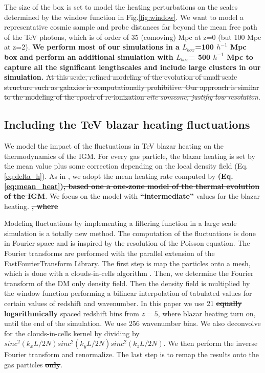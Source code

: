 \documentclass[twocolumns]{emulateapj}
\newcommand\ALc[1]{{\color{red} \bf #1}} %
\begin{document}
The size of the box is set to model the heating perturbations on the scales determined by the window function in Fig.\ref{fig:window}. We want to model a representative cosmic sample and probe distances far beyond the mean free path of the TeV photons, which is of order of 35 (comoving) Mpc at z=0 (but 100 Mpc at z=2). \ALc{We perform most of our simulations in a $L_{box}$=100 $h^{-1}$ Mpc box and perform an additional simulation with $L_{box}$= 500 $h^{-1}$ Mpc to capture all the significant lengthscales and include large clusters in our simulation.} \sout{At this scale, refined modeling of the evolution of small scale structure such as galaxies is computationally prohibitive. Our approach is similar to the modeling of the epoch of re-ionization \textit{cite someone, justifiy low resolution}}.

\subsection{Including the TeV blazar heating fluctuations}
We model the impact of the fluctuations in TeV blazar heating on the thermodynamics of the IGM. For every gas particle, the blazar heating is set by the mean value plus some correction depending on the local density field (Eq. \ref{eq:delta_h}). As in \citet{2012MNRAS.423..149P}, we adopt the mean heating rate computed by \citet{2012ApJ...752...23C}\ALc{ (Eq. \ref{eq:mean_heat})\sout{, based one a one-zone model of the thermal evolution of the IGM}}. We focus on the model with \ALc{``intermediate''} values for the blazar heating.\ALc{\sout{, where }}

Modeling fluctuations by implementing a filtering function in a large scale simulation is a totally new method. The computation of the fluctuations is done in Fourier space and is inspired by the resolution of the Poisson equation. The Fourier transforms are performed with the parallel extension of the FastFourierTransform Library. The first step is map the particles onto a mesh, which is done with a clouds-in-cells algorithm \citep{1981csup.book.....H}. Then, we  determine the Fourier transform of the DM only density field. Then the density field is  multiplied by the window function performing a bilinear interpolation of tabulated values for certain values of redshift and wavenumber. In this paper we use 21 \ALc{\sout{equally} logarithmically} spaced redshift bins from $z=5$, where blazar heating turn on, until the end of the simulation. We use 256 wavenumber bins. We also deconvolve for the clouds-in-cells kernel by dividing by $sinc^2(k_xL/2N)sinc^2(k_yL/2N)sinc^2(k_zL/2N)$. We then perform the inverse Fourier transform and renormalize. The last step is to remap the results onto the gas particles \ALc{\sout{only}}.
\end{document}

